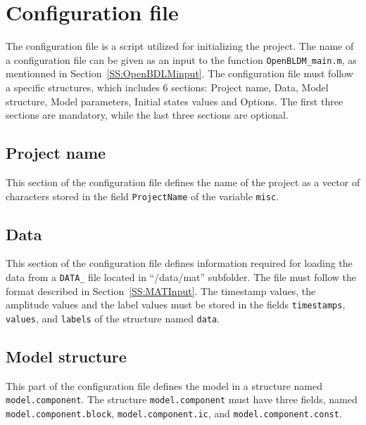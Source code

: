 \section{Configuration file}
\label{S:CFGFile}



The configuration file is a \MATLAB{} script utilized for initializing the project.
The name of a configuration file can be given as an input to the function   \lstinline[basicstyle = \mlttfamily \small ]!OpenBLDM_main.m!, as mentionned in Section~\ref{SS:OpenBDLMinput}.
The configuration file must follow a specific structures, which includes 6 sections: Project name, Data, Model structure, Model parameters, Initial states values and Options.
The first three sections are mandatory, while the last three sections are optional.

\subsection{Project name}
This section of the configuration file defines the name of the project as a vector of characters stored in the field \lstinline[basicstyle = \mlttfamily \small ]!ProjectName! of the \MATLAB{} variable \lstinline[basicstyle = \mlttfamily \small ]!misc!.

\subsection{Data}

This section of the configuration file defines information required for loading the data from a \lstinline[basicstyle = \mlttfamily \small ]!DATA_! file located in ``/data/mat'' subfolder.
The file must follow the format described in Section~\ref{SS:MATInput}.
The timestamp values, the amplitude values and the label values must be stored in the fields \lstinline[basicstyle = \mlttfamily \small]!timestamps!, \lstinline[basicstyle = \mlttfamily \small]!values!, and \lstinline[basicstyle = \mlttfamily \small]!labels! of the \MATLAB{} structure named \lstinline[basicstyle = \mlttfamily \small]!data!.

\subsection{Model structure}
\label{SS:ModelComponents}
This part of the configuration file defines the model in a \MATLAB{} structure named \lstinline[basicstyle = \mlttfamily \small]!model.component!.
The structure \lstinline[basicstyle = \mlttfamily \small]!model.component! must have three fields, named \lstinline[basicstyle = \mlttfamily \small]!model.component.block!, \lstinline[basicstyle = \mlttfamily \small]!model.component.ic!, and \lstinline[basicstyle = \mlttfamily \small]!model.component.const!.

